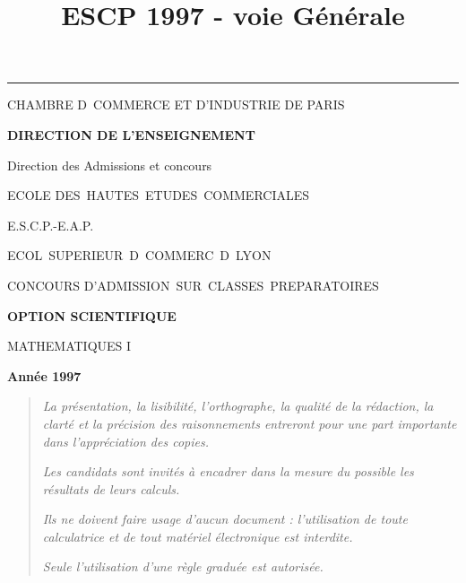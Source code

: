 \documentclass[11pt]{article}%
\title{\bf \vspace{-2cm} ESCP 1997 - voie Générale} %
\author{} %
\date{} %
\begin{document}
\maketitle %
\vspace{-1.4cm}\hrule %
\thispagestyle{fancy}

\vspace*{.2cm}




\begin{center}
{\small CHAMBRE D\E\ COMMERCE ET D'INDUSTRIE DE PARIS}

\textbf{DIRECTION DE L'ENSEIGNEMENT}

Direction des Admissions et concours

\underline{\hspace*{3cm}}

{\Large ECOLE DES\ HAUTES\ ETUDES\ COMMERCIALES}

{\Large E.S.C.P.-E.A.P.}

{\Large ECOL\E\ SUPERIEUR\E\ D\E\ COMMERC\E\ D\E\ LYON}{\large }

CONCOURS D'ADMISSION\ SUR\ CLASSES\ PREPARATOIRES

\underline{\hspace*{3cm}}

\textbf{OPTION SCIENTIFIQUE}

{\Large MATHEMATIQUES I}

\textbf{Année 1997}

\underline{\hspace*{3cm}}
\end{center}

\begin{quotation}
\noindent \textsl{La présentation, la lisibilité, l'orthographe, la
qualité
de la rédaction, la clarté et la précision des raisonnements entreront
pour
une part importante dans l'appréciation des copies.}

\noindent \textsl{Les candidats sont invités à encadrer dans la mesure
du
possible les résultats de leurs calculs.}

\noindent \textsl{Ils ne doivent faire usage d'aucun document :
l'utilisation de toute calculatrice et de tout matériel électronique
est
interdite.}

\noindent \textsl{Seule l'utilisation d'une règle graduée est
autorisée.}

\noindent \textsl{\hrulefill }
\end{quotation}
\end{document}
